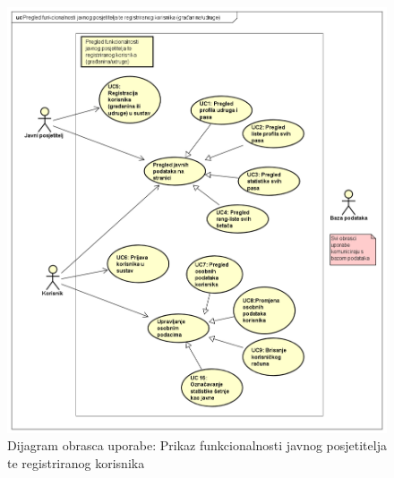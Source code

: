 				\begin{figure}[H]
					\includegraphics[scale=0.55]{dijagrami/usecase1.PNG} %
					\caption{Dijagram obrasca uporabe: Prikaz funkcionalnosti javnog posjetitelja te  registriranog korisnika}
					\label{fig:usecase1} %
				\end{figure}
			
